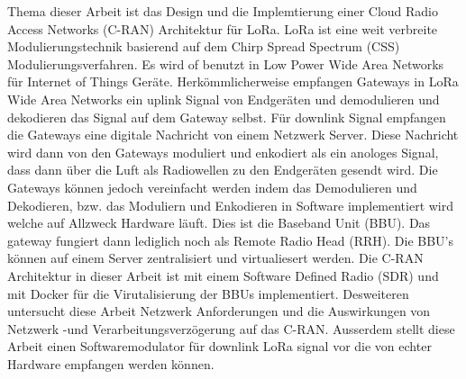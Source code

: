 Thema dieser Arbeit ist das Design und die Implemtierung einer Cloud Radio Access Networks (C-RAN)
Architektur für LoRa. LoRa ist eine weit verbreite Modulierungstechnik basierend auf dem Chirp Spread Spectrum (CSS)
Modulierungsverfahren. Es wird of benutzt in Low Power Wide Area Networks für Internet of Things Geräte. Herkömmlicherweise
empfangen Gateways in LoRa Wide Area Networks ein uplink Signal von Endgeräten und demodulieren und dekodieren das Signal
auf dem Gateway selbst. Für downlink Signal empfangen die Gateways eine digitale Nachricht von einem Netzwerk Server. Diese 
Nachricht wird dann von den Gateways moduliert und enkodiert als ein anologes Signal, dass dann über die Luft als Radiowellen
zu den Endgeräten gesendt wird. Die Gateways können jedoch vereinfacht werden indem das Demodulieren und Dekodieren, bzw. das Moduliern und Enkodieren
in Software implementiert wird welche auf Allzweck Hardware läuft. Dies ist die Baseband Unit (BBU). Das gateway fungiert dann 
lediglich noch als Remote Radio Head (RRH). Die BBU's können auf einem Server zentralisiert und virtualiesert werden.
Die C-RAN Architektur in dieser Arbeit ist mit einem Software Defined Radio (SDR) und mit Docker für die Virutalisierung der BBUs implementiert.
Desweiteren untersucht diese Arbeit Netzwerk Anforderungen und die Auswirkungen von Netzwerk -und Verarbeitungsverzögerung auf das C-RAN.
Ausserdem stellt diese Arbeit einen Softwaremodulator für downlink LoRa signal vor die von echter Hardware empfangen werden können.


